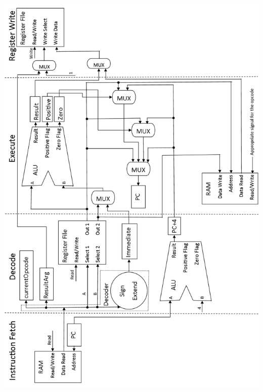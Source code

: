 \documentclass[11pt,a4paper]{IEEEtran}
\begin{document}
	\includegraphics[scale=0.45]{Datapath.png}
	
\end{document}
